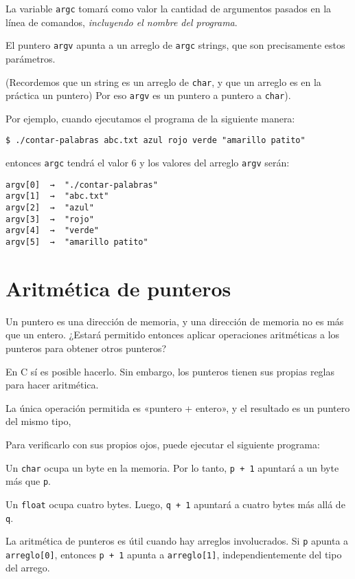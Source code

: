 La variable \lstinline!argc! tomará como valor la cantidad de argumentos
pasados en la línea de comandos, \emph{incluyendo el nombre del
programa}.

El puntero \lstinline!argv! apunta a un arreglo de \lstinline!argc!
strings, que son precisamente estos parámetros.

(Recordemos que un string es un arreglo de \lstinline!char!, y que un
arreglo es en la práctica un puntero) Por eso \lstinline!argv! es un
puntero a puntero a \lstinline!char!).

Por ejemplo, cuando ejecutamos el programa de la siguiente manera:

\begin{lstlisting}
$ ./contar-palabras abc.txt azul rojo verde "amarillo patito"
\end{lstlisting}

entonces \lstinline!argc! tendrá el valor 6 y los valores del arreglo
\lstinline!argv! serán:

\begin{verbatim}
argv[0]  →  "./contar-palabras"
argv[1]  →  "abc.txt"
argv[2]  →  "azul"
argv[3]  →  "rojo"
argv[4]  →  "verde"
argv[5]  →  "amarillo patito"
\end{verbatim}

\section{Aritmética de punteros}

Un puntero es una dirección de memoria, y una dirección de memoria no es
más que un entero. ¿Estará permitido entonces aplicar operaciones
aritméticas a los punteros para obtener otros punteros?

En C sí es posible hacerlo. Sin embargo, los punteros tienen sus propias
reglas para hacer aritmética.

La única operación permitida es «puntero + entero», y el resultado es un
puntero del mismo tipo,

Para verificarlo con sus propios ojos, puede ejecutar el siguiente
programa:

Un \lstinline!char! ocupa un byte en la memoria. Por lo tanto,
\lstinline!p + 1! apuntará a un byte más que \lstinline!p!.

Un \lstinline!float! ocupa cuatro bytes. Luego, \lstinline!q + 1!
apuntará a cuatro bytes más allá de \lstinline!q!.

La aritmética de punteros es útil cuando hay arreglos involucrados. Si
\lstinline!p! apunta a \lstinline!arreglo[0]!, entonces
\lstinline!p + 1! apunta a \lstinline!arreglo[1]!, independientemente
del tipo del arrego.


